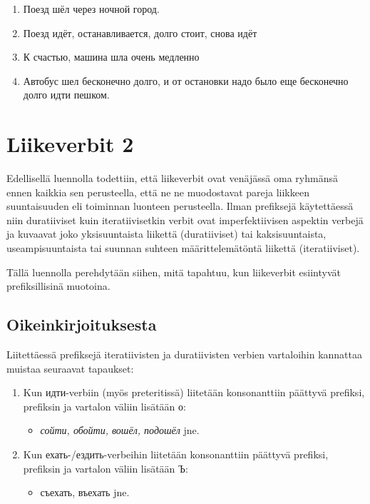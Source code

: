 \documentclass[]{scrreprt}
\providecommand{\tightlist}{%
  \setlength{\itemsep}{0pt}\setlength{\parskip}{0pt}}
\begin{document}
\begin{enumerate}
\def\labelenumi{(\arabic{enumi})}
\setcounter{enumi}{405}
\tightlist
\item
  Поезд шёл через ночной город.
\item
  Поезд идёт, останавливается, долго стоит, снова идёт
\item
  К счастью, машина шла очень медленно
\item
  Автобус шел бесконечно долго, и от остановки надо было еще бесконечно
  долго идти пешком.
\end{enumerate}

\chapter{Liikeverbit 2}\label{luento-21-liikeverbit-2}


Edellisellä luennolla todettiin, että liikeverbit ovat venäjässä oma
ryhmänsä ennen kaikkia sen perusteella, että ne ne muodostavat pareja
liikkeen suuntaisuuden eli toiminnan luonteen perusteella. Ilman
prefiksejä käytettäessä niin duratiiviset kuin iteratiivisetkin verbit
ovat imperfektiivisen aspektin verbejä ja kuvaavat joko yksisuuntaista
liikettä (duratiiviset) tai kaksisuuntaista, useampisuuntaista tai
suunnan suhteen määrittelemätöntä liikettä (iteratiiviset).

Tällä luennolla perehdytään siihen, mitä tapahtuu, kun liikeverbit
esiintyvät prefiksillisinä muotoina.

\section{Oikeinkirjoituksesta}\label{oikeinkirjoituksesta}

Liitettäessä prefiksejä iteratiivisten ja duratiivisten verbien
vartaloihin kannattaa muistaa seuraavat tapaukset:

\begin{enumerate}
\def\labelenumi{\arabic{enumi}.}
\tightlist
\item
  Kun идти-verbiin (myös preteritissä) liitetään konsonanttiin päättyvä
  prefiksi, prefiksin ja vartalon väliin lisätään о:

  \begin{itemize}
  \tightlist
  \item
    \emph{сойти, обойти, вошёл, подошёл} jne.
  \end{itemize}
\item
  Kun ехать-/ездить-verbeihin liitetään konsonanttiin päättyvä prefiksi,
  prefiksin ja vartalon väliin lisätään Ъ:

  \begin{itemize}
  \tightlist
  \item
    съехать, въехать jne.
  \end{itemize}
\end{enumerate}
\end{document}
